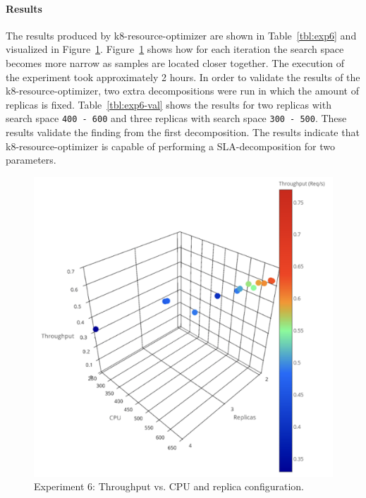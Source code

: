\paragraph{Results}
The results produced by k8-resource-optimizer are shown in Table~\ref{tbl:exp6} and visualized in Figure~\ref{fig:exp6-results}. Figure~\ref{fig:exp6-results} shows how for each iteration the search space becomes more narrow as samples are located closer together.  The execution of the experiment took approximately 2 hours. In order to validate the results of the k8-resource-optimizer, two extra decompositions were run in which the amount of replicas is fixed. Table~\ref{tbl:exp6-val} shows the results for two replicas with search space \texttt{400 - 600} and three replicas with search space \texttt{300 - 500}. These results validate the finding from the first decomposition. The results indicate that k8-resource-optimizer is capable of performing a SLA-decomposition for two parameters.
\begin{figure}[H]
    \centering
    \includegraphics[width=1\textwidth]{chapter-evaluation/plot_2_final.png}
    \caption{Experiment 6: Throughput vs. CPU and replica configuration. }
    \label{fig:exp6-results}
\end{figure}

